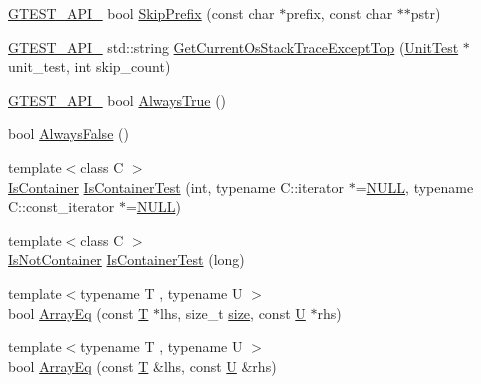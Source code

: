 \begin{DoxyCompactItemize}
\item 
\hyperlink{ts__gtest_8h_aa73be6f0ba4a7456180a94904ce17790}{G\-T\-E\-S\-T\-\_\-\-A\-P\-I\-\_\-} bool \hyperlink{namespacetesting_1_1internal_aac72b20299ad4a99554ce161e1769560}{Skip\-Prefix} (const char $\ast$prefix, const char $\ast$$\ast$pstr)
\item 
\hyperlink{ts__gtest_8h_aa73be6f0ba4a7456180a94904ce17790}{G\-T\-E\-S\-T\-\_\-\-A\-P\-I\-\_\-} std\-::string \hyperlink{namespacetesting_1_1internal_ae7ae495d3207e26968dfbd537c5e6dee}{Get\-Current\-Os\-Stack\-Trace\-Except\-Top} (\hyperlink{classtesting_1_1UnitTest}{Unit\-Test} $\ast$unit\-\_\-test, int skip\-\_\-count)
\item 
\hyperlink{ts__gtest_8h_aa73be6f0ba4a7456180a94904ce17790}{G\-T\-E\-S\-T\-\_\-\-A\-P\-I\-\_\-} bool \hyperlink{namespacetesting_1_1internal_a4d46f09c3bfe68700b7f728d2cc3782f}{Always\-True} ()
\item 
bool \hyperlink{namespacetesting_1_1internal_a4b24c851ab13569b1b15b3d259b60d2e}{Always\-False} ()
\item 
{\footnotesize template$<$class C $>$ }\\\hyperlink{namespacetesting_1_1internal_ad8f0c2883245f1df2a53618a49f0deb3}{Is\-Container} \hyperlink{namespacetesting_1_1internal_acb6ea1086293c1d6636e3c67941351fb}{Is\-Container\-Test} (int, typename C\-::iterator $\ast$=\hyperlink{Config_8cpp_a070d2ce7b6bb7e5c05602aa8c308d0c4}{N\-U\-L\-L}, typename C\-::const\-\_\-iterator $\ast$=\hyperlink{Config_8cpp_a070d2ce7b6bb7e5c05602aa8c308d0c4}{N\-U\-L\-L})
\item 
{\footnotesize template$<$class C $>$ }\\\hyperlink{namespacetesting_1_1internal_abf080521ce135deb510e0a7830fd3d33}{Is\-Not\-Container} \hyperlink{namespacetesting_1_1internal_af545a2ae928b8a9e7581978234464275}{Is\-Container\-Test} (long)
\item 
{\footnotesize template$<$typename T , typename U $>$ }\\bool \hyperlink{namespacetesting_1_1internal_af4bebf36baf0b0a5b26d051dde55fa47}{Array\-Eq} (const \hyperlink{calib3d_8hpp_a3efb9551a871ddd0463079a808916717}{T} $\ast$lhs, size\-\_\-t \hyperlink{legacy_8hpp_ae97003f8d5c64cdfb99f6f2606d121b6}{size}, const \hyperlink{core__c_8h_aa9c521f41af9a5191e5e4b6ffbae211a}{U} $\ast$rhs)
\item 
{\footnotesize template$<$typename T , typename U $>$ }\\bool \hyperlink{namespacetesting_1_1internal_a49b4d0ee49c0f8c93bab29ebd20630cc}{Array\-Eq} (const \hyperlink{calib3d_8hpp_a3efb9551a871ddd0463079a808916717}{T} \&lhs, const \hyperlink{core__c_8h_aa9c521f41af9a5191e5e4b6ffbae211a}{U} \&rhs)
$$
\end{DoxyCompactItemize}
